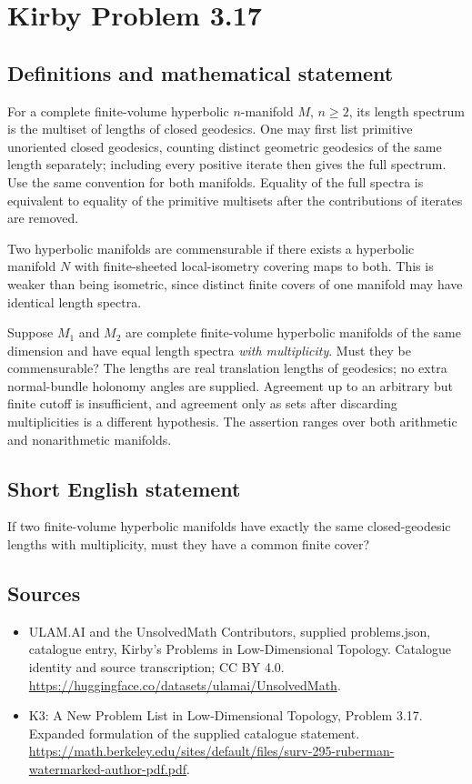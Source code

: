 \documentclass[11pt,a4paper]{article}
\begin{document}
\section*{Kirby Problem 3.17}\label{statement}

\subsection{Definitions and mathematical statement}
For a complete finite-volume hyperbolic $n$-manifold $M$, $n\geq2$, its
length spectrum is the multiset of lengths of closed geodesics. One may first
list primitive unoriented closed geodesics, counting distinct geometric
geodesics of the same length separately; including every positive iterate
then gives the full spectrum. Use the same convention for both manifolds.
Equality of the full spectra is equivalent to equality of the primitive
multisets after the contributions of iterates are removed.

Two hyperbolic manifolds are commensurable if there exists a hyperbolic
manifold $N$ with finite-sheeted local-isometry covering maps to both.
This is weaker than being isometric, since distinct finite covers of one
manifold may have identical length spectra.

Suppose $M_1$ and $M_2$ are complete finite-volume hyperbolic manifolds
of the same dimension and have equal length spectra \emph{with multiplicity}.
Must they be commensurable? The lengths are real translation lengths of
geodesics; no extra normal-bundle holonomy angles are supplied. Agreement
up to an arbitrary but finite cutoff is insufficient, and agreement only
as sets after discarding multiplicities is a different hypothesis. The
assertion ranges over both arithmetic and nonarithmetic manifolds.
\subsection{Short English statement}
If two finite-volume hyperbolic manifolds have exactly the same closed-geodesic lengths with multiplicity, must they have a common finite cover?
\subsection{Sources}
\begin{itemize}
\item[S1] ULAM.AI and the UnsolvedMath Contributors, supplied problems.json, catalogue entry, Kirby's Problems in Low-Dimensional Topology. Catalogue identity and source transcription; CC BY 4.0.
\url{https://huggingface.co/datasets/ulamai/UnsolvedMath}.
\item[S2] K3: A New Problem List in Low-Dimensional Topology, Problem 3.17. Expanded formulation of the supplied catalogue statement.
\url{https://math.berkeley.edu/sites/default/files/surv-295-ruberman-watermarked-author-pdf.pdf}.
\end{itemize}
\end{document}
